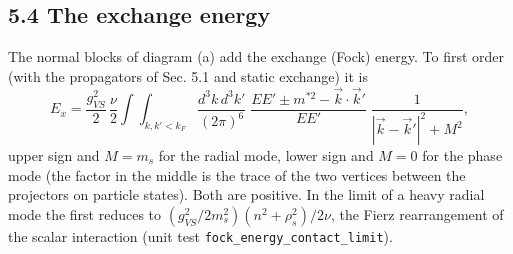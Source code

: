 \documentclass[
  10pt,
]{article}
\begin{document}
\hypertarget{the-exchange-energy}{%
\subsection{5.4 The exchange energy}\label{the-exchange-energy}}

The normal blocks of diagram (a) add the exchange (Fock) energy. To
first order (with the propagators of Sec. 5.1 and static exchange) it is
\[E_x=\frac{g_{VS}^2}{2}\,\frac\nu2\!\int\!\!\int_{k,k'<k_F}\!\frac{d^3k\,d^3k'}{(2\pi)^6}\;\frac{EE'\pm m^{*2}-\vec k\cdot\vec k'}{EE'}\;\frac{1}{|\vec k-\vec k'|^2+M^2},\]
upper sign and \(M=m_s\) for the radial mode, lower sign and \(M=0\) for
the phase mode (the factor in the middle is the trace of the two
vertices between the projectors on particle states). Both are positive.
In the limit of a heavy radial mode the first reduces to
\((g_{VS}^2/2m_s^2)(n^2+\rho_s^2)/2\nu\), the Fierz rearrangement of the
scalar interaction (unit test \texttt{fock\_energy\_contact\_limit}).
\end{document}
